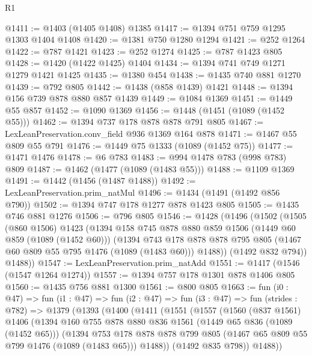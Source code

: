 \begin{lexlean}{R1}
\begin{coremodule}
@1411 := @1403 (@1405 @1408) @1385
@1417 := @1394 @751 @759 @1295 @1303 @1404 @1408
@1420 := @1381 @750 @1280 @1294
@1421 := @252 @1264
@1422 := @787 @1421
@1423 := @252 @1274
@1425 := @787 @1423 @805
@1428 := @1420 (@1422 @1425) @1404
@1434 := @1394 @741 @749 @1271 @1279 @1421 @1425
@1435 := @1380 @454
@1438 := @1435 @740 @881 @1270
@1439 := @792 @805
@1442 := @1438 (@858 @1439) @1421
@1448 := @1394 @156 @739 @878 @880 @857 @1439
@1449 := @1084 @1369
@1451 := @1449 @55 @857
@1452 := @1090 @1369
@1456 := @1448 (@1451 (@1089 (@1452 @55)))
@1462 := @1394 @737 @178 @878 @878 @791 @805
@1467 := LexLeanPreservation.conv_field @936 @1369 @164 @878
@1471 := @1467 @55 @809 @55 @791
@1476 := @1449 @75 @1333 (@1089 (@1452 @75))
@1477 := @1471 @1476
@1478 := @6 @783
@1483 := @994 @1478 @783 (@998 @783) @809
@1487 := @1462 (@1477 (@1089 (@1483 @55)))
@1488 := @1109 @1369
@1491 := @1442 (@1456 (@1487 @1488))
@1492 := LexLeanPreservation.prim_natMul
@1496 := @1434 (@1491 (@1492 @856 @790))
@1502 := @1394 @747 @178 @1277 @878 @1423 @805
@1505 := @1435 @746 @881 @1276
@1506 := @796 @805
@1546 := @1428
    (@1496
      (@1502
        (@1505
          (@860 @1506)
          @1423
          (@1394
            @158
            @745
            @878
            @880
            @859
            @1506
            (@1449 @60 @859 (@1089 (@1452 @60)))
            (@1394
              @743
              @178
              @878
              @878
              @795
              @805
              (@1467 @60 @809 @55 @795 @1476 (@1089 (@1483 @60)))
              @1488))
          (@1492 @832 @794))
        @1488))
@1547 := LexLeanPreservation.prim_natAdd
@1551 := @1417 (@1546 (@1547 @1264 @1274))
@1557 := @1394 @757 @178 @1301 @878 @1406 @805
@1560 := @1435 @756 @881 @1300
@1561 := @800 @805
@1663 := fun (i0 : @47) =>
  fun (i1 : @47) =>
  fun (i2 : @47) =>
  fun (i3 : @47) =>
  fun (strides : @782) =>
  @1379
    (@1393
      (@1400
        (@1411
          (@1551
            (@1557
              (@1560
                (@837 @1561)
                @1406
                (@1394
                  @160
                  @755
                  @878
                  @880
                  @836
                  @1561
                  (@1449 @65 @836 (@1089 (@1452 @65)))
                  (@1394
                    @753
                    @178
                    @878
                    @878
                    @799
                    @805
                    (@1467 @65 @809 @55 @799 @1476 (@1089 (@1483 @65)))
                    @1488))
                (@1492 @835 @798))
              @1488))

\end{coremodule}
\end{lexlean}
